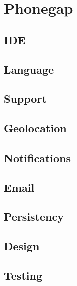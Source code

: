 \section{Phonegap}

\subsection{IDE}

\subsection{Language}

\subsection{Support}

\subsection{Geolocation}

\subsection{Notifications}

\subsection{Email}

\subsection{Persistency}

\subsection{Design}

\subsection{Testing}
